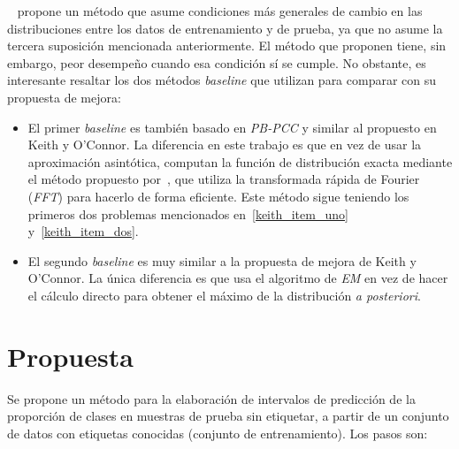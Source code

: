 ~\citet{denham2021gain} propone un método que asume condiciones más generales de
cambio en las distribuciones entre los datos de entrenamiento y de prueba, ya
que no asume la tercera suposición mencionada anteriormente. El método que
proponen tiene, sin embargo, peor desempeño cuando esa condición sí se cumple.
No obstante, es interesante resaltar los dos métodos {\it baseline\/} que
utilizan para comparar con su propuesta de mejora:

\begin{itemize}
    \item El primer {\it baseline\/} es también basado en {\it PB-PCC\/} y
    similar al propuesto en Keith y O'Connor. La diferencia en este trabajo es
    que en vez de usar la aproximación asintótica, computan la función de
    distribución exacta mediante el método propuesto
    por~\citet{hong2013computing}, que utiliza la transformada rápida de Fourier
    ({\it FFT\/}) para hacerlo de forma eficiente. Este método sigue teniendo
    los primeros dos problemas mencionados en~\ref{keith_item_uno}
    y~\ref{keith_item_dos}.
    \item El segundo {\it baseline\/} es muy similar a la propuesta de mejora de
    Keith y O'Connor. La única diferencia es que usa el algoritmo de {\it EM\/}
    en vez de hacer el cálculo directo para obtener el máximo de la distribución
    {\it a posteriori}.
\end{itemize}

\section{Propuesta}\label{introduccion:propuesta}

Se propone un método para la elaboración de intervalos de predicción de la
proporción de clases en muestras de prueba sin etiquetar, a partir de un
conjunto de datos con etiquetas conocidas (conjunto de entrenamiento). Los pasos
son:

